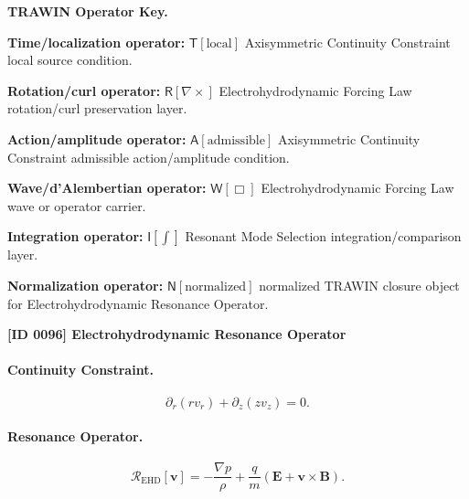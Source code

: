 \par\vspace{0.45\baselineskip}
\noindent\begin{minipage}[t]{\linewidth}
\begingroup
\small
\raggedright
\textbf{TRAWIN Operator Key.}\par
\noindent\textbf{Time/localization operator:} $\mathsf{T}\!\left[\mathrm{local}\right]$ Axisymmetric Continuity Constraint local source condition.\par
\noindent\textbf{Rotation/curl operator:} $\mathsf{R}\!\left[\nabla\times\right]$ Electrohydrodynamic Forcing Law rotation/curl preservation layer.\par
\noindent\textbf{Action/amplitude operator:} $\mathsf{A}\!\left[\mathrm{admissible}\right]$ Axisymmetric Continuity Constraint admissible action/amplitude condition.\par
\noindent\textbf{Wave/d'Alembertian operator:} $\mathsf{W}\!\left[\Box\right]$ Electrohydrodynamic Forcing Law wave or operator carrier.\par
\noindent\textbf{Integration operator:} $\mathsf{I}\!\left[\int\right]$ Resonant Mode Selection integration/comparison layer.\par
\noindent\textbf{Normalization operator:} $\mathsf{N}\!\left[\mathrm{normalized}\right]$ normalized TRAWIN closure object for Electrohydrodynamic Resonance Operator.\par
\endgroup
\end{minipage}

\clearpage
\noindent\textbf{[ID 0096] Electrohydrodynamic Resonance Operator}\par
\vspace{0.35em}
\paragraph{Continuity Constraint.}
\begin{equation}
\partial_r(rv_r)+\partial_z(zv_z)=0.
\end{equation}

\paragraph{Resonance Operator.}
\begin{equation}
\mathcal{R}_{\mathrm{EHD}}[\mathbf{v}]
=
-\frac{\nabla p}{\rho}
+
\frac{q}{m}
(\mathbf{E}+\mathbf{v}\times\mathbf{B}).
\end{equation}


